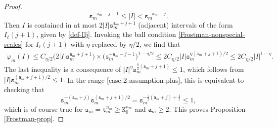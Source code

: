 \documentclass[12pt, twoside]{article}
\theoremstyle{definition}
\numberwithin{equation}{section}
\begin{document}
\begin{proof}
\begin{equation}
		\mathtt s_m^{-\mathtt a_m - j - 1} \leq |I| < \mathtt s_m^{-\mathtt a_m - j}.
	\end{equation}  
	Then $I$ is contained in at most {$2|I| \mathtt s_m^{\mathtt a_m + j + 1}$} (adjacent) intervals of the form $I_{\ell}(j+1)$, given by \eqref{def-Ilj}. Invoking the ball condition \eqref{Frostman-nonspecial-scales} for $I_{\ell}(j+1)$ with $\eta$ replaced by $\eta/2$, we find that 
	\begin{align*}  
		\varphi_m(I) \leq C_{\eta/2} \bigl(2|I| \mathtt s_m^{\mathtt a_m +j + 1}\bigr) \times \bigl( \mathtt s_m^{-\mathtt a_m - j - 1} \bigr)^{1 - \eta/2} 
		{\leq 2C_{\eta/2} |I| \mathtt s_m^{{\eta}(\mathtt a_m  + j + 1)/2} \leq 2C_{\eta/2} |I|^{1 - \eta}. }
	\end{align*}  
	The last inequality is a consequence of {$|I|^{\eta} \mathtt s_m^{\frac{\eta}{2}(\mathtt a_m + j + 1)} \leq 1$,} {which follows from $|I| \mathtt s_m^{(\mathtt a_m  + j + 1)/2} \leq 1$.} In the {range \eqref{case-2-assumption-plus},} this is equivalent to checking that 
	\[ \mathtt s_m^{-(\mathtt a_m + j)} \mathtt s_m^{(\mathtt a_m + j + 1)/2} = \mathtt s_m^{-\frac{1}{2}(\mathtt a_m + j) + \frac{1}{2}} \leq 1, \] 
	which is of course true for {$\mathtt s_m = \mathtt t_m^{n_m} \geq \mathtt K_0^{n_m}$} and $\mathtt a_m \geq 2$. This proves Proposition \ref{Frostman-prop}. 

\end{proof}
\end{document}
